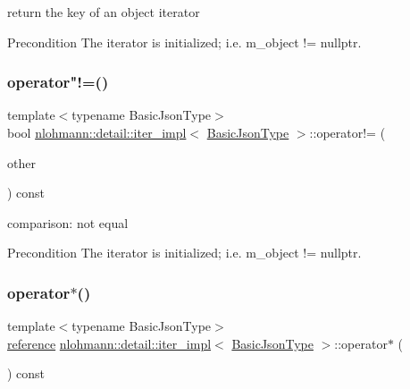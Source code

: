return the key of an object iterator 

\begin{DoxyPrecond}{Precondition}
The iterator is initialized; i.\+e. {\ttfamily m\+\_\+object != nullptr}. 
\end{DoxyPrecond}
\mbox{\label{classnlohmann_1_1detail_1_1iter__impl_aeab0e2b5da70b3bdebecd5b1a6ee66a6}} 
\subsubsection{\texorpdfstring{operator"!=()}{operator!=()}}
{\footnotesize\ttfamily template$<$typename Basic\+Json\+Type$>$ \\
bool \hyperlink{classnlohmann_1_1detail_1_1iter__impl}{nlohmann\+::detail\+::iter\+\_\+impl}$<$ \hyperlink{classnlohmann_1_1detail_1_1iter__impl_abf18f18793f84b0222aebb5a2a87da7a}{Basic\+Json\+Type} $>$\+::operator!= (\begin{DoxyParamCaption}\item[{const \hyperlink{classnlohmann_1_1detail_1_1iter__impl}{iter\+\_\+impl}$<$ \hyperlink{classnlohmann_1_1detail_1_1iter__impl_abf18f18793f84b0222aebb5a2a87da7a}{Basic\+Json\+Type} $>$ \&}]{other }\end{DoxyParamCaption}) const\hspace{0.3cm}{\ttfamily [inline]}}



comparison\+: not equal 

\begin{DoxyPrecond}{Precondition}
The iterator is initialized; i.\+e. {\ttfamily m\+\_\+object != nullptr}. 
\end{DoxyPrecond}
\mbox{\label{classnlohmann_1_1detail_1_1iter__impl_a5ca57856d9bba54a5fc51cee891de827}} 
\subsubsection{\texorpdfstring{operator$\ast$()}{operator*()}}
{\footnotesize\ttfamily template$<$typename Basic\+Json\+Type$>$ \\
\hyperlink{classnlohmann_1_1detail_1_1iter__impl_a5be8001be099c6b82310f4d387b953ce}{reference} \hyperlink{classnlohmann_1_1detail_1_1iter__impl}{nlohmann\+::detail\+::iter\+\_\+impl}$<$ \hyperlink{classnlohmann_1_1detail_1_1iter__impl_abf18f18793f84b0222aebb5a2a87da7a}{Basic\+Json\+Type} $>$\+::operator$\ast$ (\begin{DoxyParamCaption}{ }\end{DoxyParamCaption}) const\hspace{0.3cm}{\ttfamily [inline]}}



